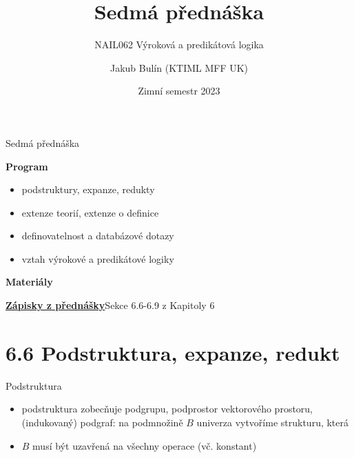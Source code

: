 \documentclass{beamer}
\title{Sedmá přednáška}
\subtitle{NAIL062 Výroková a predikátová logika}
\author{Jakub Bulín (KTIML MFF UK)}
\date{Zimní semestr 2023}
\begin{document}
\frame{\titlepage}


\begin{frame}{Sedmá přednáška}

    \textbf{Program}
        \begin{itemize}
            \item podstruktury, expanze, redukty           
            \item extenze teorií, extenze o definice
            \item definovatelnost a databázové dotazy
            \item vztah výrokové a predikátové logiky
        \end{itemize}

    \textbf{Materiály}

        \href{https://github.com/jbulin-mff-uk/nail062/raw/main/lecture/lecture-notes/lecture-notes.pdf}{\alert{\textbf{Zápisky z přednášky}}}Sekce 6.6-6.9 z Kapitoly 6

\end{frame}


\section{6.6 Podstruktura, expanze, redukt}


\begin{frame}{Podstruktura}

    \begin{itemize}
        \item \alert{podstruktura} zobecňuje podgrupu, podprostor vektorového prostoru, (indukovaný) podgraf: na podmnožině $B$ univerza vytvoříme strukturu, která 
        \item $B$ musí být \alert{uzavřená} na všechny operace (vč. konstant)
    \end{itemize}

    


\end{frame}
\end{document}
